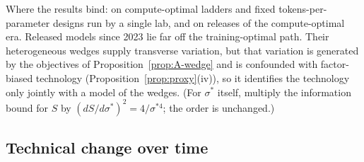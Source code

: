 \begin{remark}
Where the results bind: on compute-optimal ladders and fixed tokens-per-parameter designs run by a single lab, and on
releases of the compute-optimal era. Released models since 2023 lie far off the training-optimal path. Their heterogeneous
wedges supply transverse variation, but that variation is generated by the objectives of Proposition~\ref{prop:A-wedge}
and is confounded with factor-biased technology (Proposition~\ref{prop:proxy}(iv)), so it identifies the technology only
jointly with a model of the wedges. (For $\sigma^*$ itself, multiply the information bound for $S$ by
$(dS/d\sigma^*)^2=4/\sigma^{*4}$; the order is unchanged.)
\end{remark}

\subsection{Technical change over time}\label{app:dmr}

